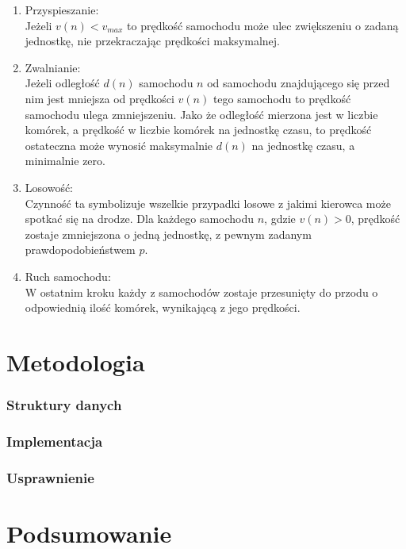 \documentclass[a4paper,12pt]{article}
\begin{document}
	\begin{enumerate}
		\item Przyspieszanie: \\
		Jeżeli $v(n) < v_{max}$ to prędkość samochodu może ulec zwiększeniu o zadaną jednostkę, nie przekraczając prędkości maksymalnej.
		\item Zwalnianie: \\
		Jeżeli odległość $d(n)$ samochodu $n$ od samochodu znajdującego się przed nim jest mniejsza od prędkości $v(n)$ tego samochodu to prędkość samochodu ulega zmniejszeniu. Jako że odległość mierzona jest w liczbie komórek, a prędkość w liczbie komórek na jednostkę czasu, to prędkość ostateczna może wynosić maksymalnie $d(n)$ na jednostkę czasu, a minimalnie zero.
		\item Losowość: \\
		Czynność ta symbolizuje wszelkie przypadki losowe z jakimi kierowca może spotkać się na drodze. Dla każdego samochodu $n$, gdzie $v(n) > 0$, prędkość zostaje zmniejszona o jedną jednostkę, z pewnym zadanym prawdopodobieństwem $p$.
		\item Ruch samochodu: \\
		W ostatnim kroku każdy z samochodów zostaje przesunięty do przodu o odpowiednią ilość komórek, wynikającą z jego prędkości.
	\end{enumerate}

    \part{Metodologia}

    \section{Struktury danych}

    \section{Implementacja}

    \section{Usprawnienie}

    \part{Podsumowanie}
\end{document}
